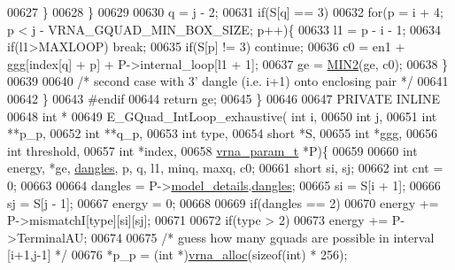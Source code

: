 \begin{DoxyCode}
00627       \}
00628     \}
00629 
00630     q = j - 2;
00631     \textcolor{keywordflow}{if}(S[q] == 3)
00632       \textcolor{keywordflow}{for}(p = i + 4; p < j - VRNA\_GQUAD\_MIN\_BOX\_SIZE; p++)\{
00633         l1    = p - i - 1;
00634         \textcolor{keywordflow}{if}(l1>MAXLOOP) \textcolor{keywordflow}{break};
00635         \textcolor{keywordflow}{if}(S[p] != 3) \textcolor{keywordflow}{continue};
00636         c0  = en1 + ggg[index[q] + p] + P->internal\_loop[l1 + 1];
00637         ge  = \hyperlink{group__utils_ga2dd4a927a7f937f43a90c144d79107d8}{MIN2}(ge, c0);
00638       \}
00639 
00640     \textcolor{comment}{/* second case with 3' dangle (i.e. i+1) onto enclosing pair */}
00641 
00642   \}
00643 \textcolor{preprocessor}{#endif}
00644   \textcolor{keywordflow}{return} ge;
00645 \}
00646 
00647 PRIVATE INLINE
00648 \textcolor{keywordtype}{int} *
00649 E\_GQuad\_IntLoop\_exhaustive( \textcolor{keywordtype}{int} i,
00650                             \textcolor{keywordtype}{int} j,
00651                             \textcolor{keywordtype}{int} **p\_p,
00652                             \textcolor{keywordtype}{int} **q\_p,
00653                             \textcolor{keywordtype}{int} type,
00654                             \textcolor{keywordtype}{short} *S,
00655                             \textcolor{keywordtype}{int} *ggg,
00656                             \textcolor{keywordtype}{int} threshold,
00657                             \textcolor{keywordtype}{int} *index,
00658                             \hyperlink{group__energy__parameters_structvrna__param__s}{vrna\_param\_t} *P)\{
00659 
00660   \textcolor{keywordtype}{int} energy, *ge, \hyperlink{group__model__details_ga72b511ed1201f7e23ec437e468790d74}{dangles}, p, q, l1, minq, maxq, c0;
00661   \textcolor{keywordtype}{short} si, sj;
00662   \textcolor{keywordtype}{int} cnt = 0;
00663 
00664   dangles = P->\hyperlink{group__energy__parameters_a7b84353eb9075c595bad4ceb871bcae7}{model\_details}.\hyperlink{group__model__details_adcda4ff2ea77748ae0e8700288282efc}{dangles};
00665   si      = S[i + 1];
00666   sj      = S[j - 1];
00667   energy  = 0;
00668 
00669   \textcolor{keywordflow}{if}(dangles == 2)
00670     energy += P->mismatchI[type][si][sj];
00671 
00672   \textcolor{keywordflow}{if}(type > 2)
00673     energy += P->TerminalAU;
00674 
00675   \textcolor{comment}{/* guess how many gquads are possible in interval [i+1,j-1] */}
00676   *p\_p  = (\textcolor{keywordtype}{int} *)\hyperlink{group__utils_gaf37a0979367c977edfb9da6614eebe99}{vrna\_alloc}(\textcolor{keyword}{sizeof}(\textcolor{keywordtype}{int}) * 256);

\end{DoxyCode}
